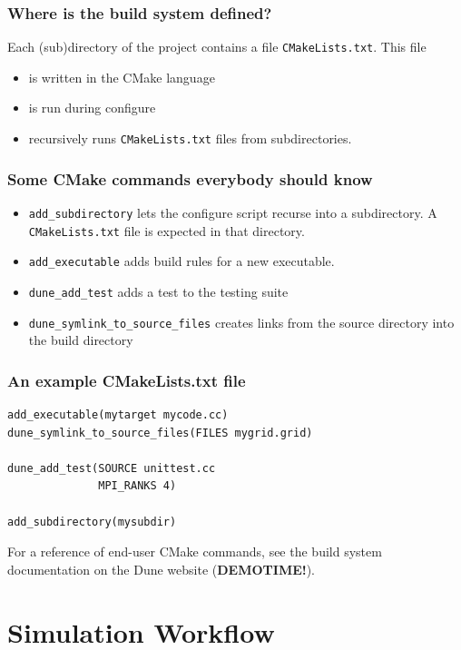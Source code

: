 \documentclass[aspectratio=169,11pt]{beamer}
\theoremstyle{definition}
\begin{document}
\begin{frame}[fragile]
 \frametitle{Where is the build system defined?}
 Each (sub)directory of the project contains a file \lstinline!CMakeLists.txt!. This file
 \begin{itemize}
  \item is written in the CMake language
  \item is run during configure
  \item recursively runs \lstinline!CMakeLists.txt! files from subdirectories.
 \end{itemize}
\end{frame}

\begin{frame}[fragile]
 \frametitle{Some CMake commands everybody should know}

 \begin{itemize}
  \item \lstinline!add_subdirectory! lets the configure script recurse into a subdirectory.
  A \lstinline!CMakeLists.txt! file is expected in that directory.
  \item \lstinline!add_executable! adds build rules for a new executable.
  \item \lstinline!dune_add_test! adds a test to the testing suite
  \item \lstinline!dune_symlink_to_source_files! creates links from the source directory into the build directory
 \end{itemize}
\end{frame}

\begin{frame}[fragile]
 \frametitle{An example CMakeLists.txt file}
 \begin{lstlisting}
add_executable(mytarget mycode.cc)
dune_symlink_to_source_files(FILES mygrid.grid)

dune_add_test(SOURCE unittest.cc
              MPI_RANKS 4)

add_subdirectory(mysubdir)
 \end{lstlisting}
\vspace{0.5cm}
  For a reference of end-user CMake commands, see the build system documentation on the Dune website (\textbf{DEMOTIME!}).

\end{frame}


\section{Simulation Workflow}
\end{document}
